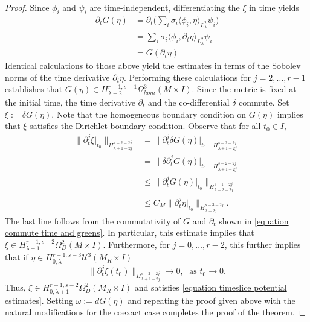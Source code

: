 \documentclass[10pt,a4paper]{amsart}
\newcommand{\dd}{\partial}
\newcommand{\de}{\delta}
\newcommand{\la}{\lambda}
\newcommand{\om}{\omega}
\newcommand{\sU}{{\mathscr U}}
\newcommand{\sg}{\sigma}
\begin{document}
\begin{proof}
Since $\phi_i$ and $\psi_i$ are time-independent, differentiating the $\xi$ in time yields
\begin{align}\label{equation commute time and greens}
    \dd_t G(\eta) &= \dd_t \bigg(\sum_i \sg_i \langle \phi_i, \eta \rangle_{L^2_\la} \psi_i\bigg)\\
    &= \sum_i \sg_i \langle \phi_i, \dd_t \eta \rangle_{L^2_\la} \psi_i \nonumber\\
    &= G(\dd_t \eta) \nonumber
\end{align}
Identical calculations to those above yield the estimates in terms of the Sobolev norms of the time derivative $\dd_t \eta$. Performing these calculations for $j = 2,\ldots,r-1$ establishes that $G(\eta) \in H^{r-1, s-1}_{\la+2}\Omega^3_{hom} (M \times I)$. Since the metric is fixed at the initial time, the time derivative $\dd_t$ and the co-differential $\de$ commute. Set $\xi := \de G(\eta)$. Note that the homogeneous boundary condition on $G(\eta)$ implies that $\xi$ satisfies the Dirichlet boundary condition. Observe that for all $t_0 \in I$,
\begin{align*}
    \big\|\dd_t^j \xi \big|_{t_0} \big\|_{H_{\la+1 - 2j}^{s-2-2j}} &= \big\|\dd_t^j \de G(\eta) \big|_{t_0} \big\|_{H_{\la+1 - 2j}^{s-2-2j}} \\
    &= \big\|\de \dd_t^j G( \eta) \big|_{t_0} \big\|_{H_{\la+1 - 2j}^{s-2-2j}} \\
    &\le \big\|\dd_t^j G( \eta )\big|_{t_0} \big\|_{H_{\la+2 - 2j}^{s-1-2j}} \\
    &\le C_M \big\|\dd_t^j \eta \big|_{t_0} \big\|_{H_{\la-2j}^{s-3-2j}}.
\end{align*}
The last line follows from the commutativity of $G$ and $\dd_t$ shown in \eqref{equation commute time and greens}. In particular, this estimate implies that $\xi \in H^{r-1, s-2}_{\la+1}\Omega^2_{D} (M \times I)$. Furthermore, for $j = 0,\ldots, r-2$, this further implies that if $\eta \in H_{0,\la}^{r-1,s-3}\sU^3(M_R \times I)$
\[
\|\dd_t^j \xi (t_0)\|_{H_{\la+1 - 2j}^{s-2-2j}} \rightarrow 0, \; \text{ as } t_0 \rightarrow 0.
\]
Thus, $\xi \in H_{0,\la+1}^{r-1,s-2}\Omega_D^2(M_R \times I)$ and satisfies \eqref{equation timeslice potential estimates}. Setting $\om :=  dG(\eta)$ and repeating the proof given above with the natural modifications for the coexact case completes the proof of the theorem.
\end{proof}
\end{document}
